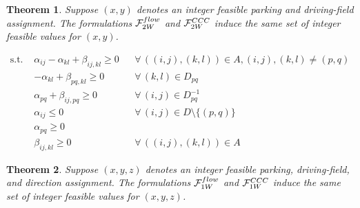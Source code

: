 \documentclass[10pt,a4paper]{amsart}
\newtheorem{theorem}{Theorem}
\newcommand{\entrancex}{p}
\newcommand{\entrancey}{q}
\newcommand{\gridadjset}[2]{D_{#1#2}}
\newcommand{\gridarcset}{A}
\newcommand{\gridinvadjset}[2]{D^{-1}_{#1#2}}
\newcommand{\validdriveset}{D}
\begin{document}
\begin{theorem}
\label{theorem:two_way}
Suppose $(x, y)$ denotes an integer feasible parking and driving-field assignment. The formulations $\mathcal{F}_{\textsc{2W}}^{\textsc{flow}}$ and $\mathcal{F}_{\textsc{2W}}^{\textsc{CCC}}$ induce the same set of integer feasible values for $(x,y)$.
\end{theorem} 

\begin{align}
    \text{s.t. } & \alpha_{ij} - \alpha_{kl} + \beta_{ij, kl} \geq 0 && \forall \, ((i,j), (k,l)) \in \gridarcset, (i, j), (k, l) \neq (p, q)  \label{eq:sp_dual_1} \\
     & - \alpha_{kl} + \beta_{pq, kl} \geq 0 && \forall \,  (k, l) \in \gridadjset{p}{q}  \label{eq:sp_dual_2} \\
    & \alpha_{pq} + \beta_{ij, pq} \geq 0 && \forall \,  (i, j) \in \gridinvadjset{p}{q}  \label{eq:sp_dual_3} \\
    & \alpha_{ij} \leq 0 && \forall \, (i,j) \in \validdriveset \setminus \{(\entrancex, \entrancey)\} \label{eq:sp_dual_4} \\
    & \alpha_{pq} \geq 0 &&  \label{eq:sp_dual_4.5} \\
    & \beta_{ij, kl} \geq 0 && \forall \, ((i,j), (k,l)) \in \gridarcset \label{eq:sp_dual_5} 
\end{align}

\begin{theorem}
Suppose $(x, y, z)$ denotes an integer feasible parking, driving-field, and direction assignment. The formulations $\mathcal{F}_{\textsc{1W}}^{\textsc{flow}}$ and $\mathcal{F}_{\textsc{1W}}^{\textsc{CCC}}$ induce the same set of integer feasible values for $(x,y,z)$.
\end{theorem}
\end{document}

